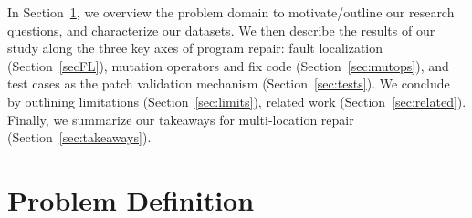 \documentclass[10pt, conference]{IEEEtran}
\begin{document}
In Section~\ref{sec:background}, we overview the problem domain to
motivate/outline our research questions, and characterize our datasets.
We then describe the results of our study along the
three key axes of program repair: fault localization (Section~\ref{secFL}),
mutation operators and fix code (Section~\ref{sec:mutops}), and test cases as
the patch validation mechanism (Section~\ref{sec:tests}).  We conclude by
outlining limitations (Section~\ref{sec:limits}), related work
(Section~\ref{sec:related}).  Finally, 
we summarize our takeaways for 
multi-location repair (Section~\ref{sec:takeaways}).

\section{Problem Definition}
\label{sec:background}
\end{document}
